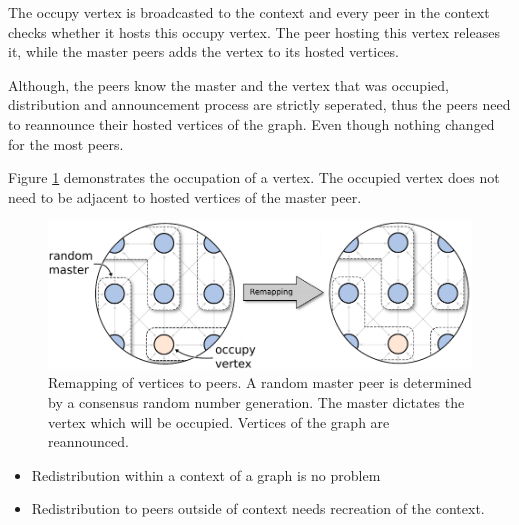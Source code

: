The occupy vertex is broadcasted to the context and every peer in
the context checks whether it hosts this occupy vertex. The peer
hosting this vertex releases it, while the master peers adds the vertex
to its hosted vertices.

Although, the peers know the master and the vertex that was
occupied, distribution and announcement process are strictly
seperated, thus the peers need to reannounce their hosted vertices
of the graph. Even though nothing changed for the most peers.


Figure \ref{fig:gol_remapping} demonstrates the occupation of a vertex.
The occupied vertex does not need to be adjacent to hosted vertices
  of the master peer.

  \begin{figure}[H]
    \centering
    \includegraphics[width=\textwidth]{graphics/40_gol_remapping}
    \caption{Remapping of vertices to peers. A random master peer is
      determined by a consensus random number generation. The master
      dictates the vertex which will be occupied. Vertices of the
      graph are reannounced.}
    \label{fig:gol_remapping}
  \end{figure}


  \begin{itemize}

  \item Redistribution within a context of a graph is no problem
  \item Redistribution to peers outside of context needs recreation of
    the context.

  \end{itemize}



\cleardoublepage

